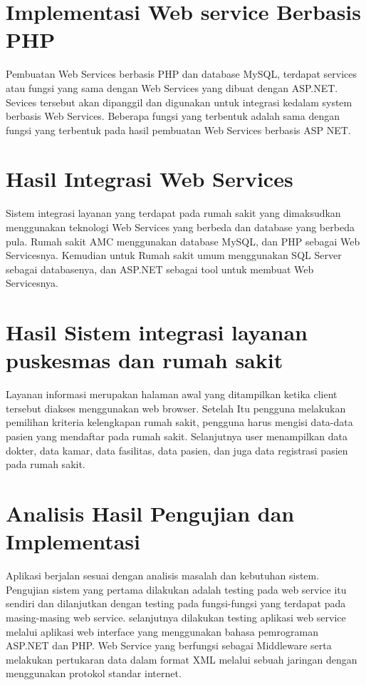 \documentclass[12pt,a4paper]{article}
\begin{document}
\section{Implementasi Web service Berbasis PHP}
Pembuatan Web Services berbasis PHP dan database MySQL, terdapat  services atau fungsi yang sama 
dengan Web Services yang dibuat dengan ASP.NET. Sevices tersebut akan dipanggil dan digunakan untuk 
integrasi kedalam system berbasis Web Services. Beberapa fungsi yang terbentuk adalah sama dengan fungsi 
yang terbentuk pada hasil pembuatan Web Services berbasis ASP NET.


\section{Hasil Integrasi Web Services}
Sistem integrasi  layanan yang terdapat pada rumah sakit yang dimaksudkan menggunakan teknologi Web Services 
yang berbeda dan database yang berbeda pula. Rumah sakit AMC menggunakan database MySQL, dan PHP sebagai Web Servicesnya.
Kemudian untuk Rumah sakit umum menggunakan SQL Server sebagai databasenya, dan ASP.NET sebagai tool untuk membuat Web Servicesnya.


\section{Hasil Sistem integrasi  layanan puskesmas dan rumah sakit}
Layanan informasi merupakan halaman awal yang ditampilkan ketika client tersebut diakses menggunakan web browser. 
Setelah Itu pengguna melakukan pemilihan kriteria kelengkapan rumah sakit, pengguna harus mengisi data-data pasien yang mendaftar pada rumah sakit. Selanjutnya user  menampilkan data dokter, data kamar, data fasilitas, data pasien, dan juga data registrasi pasien pada rumah sakit.


\section{Analisis Hasil Pengujian dan Implementasi}
Aplikasi berjalan sesuai dengan analisis masalah dan kebutuhan sistem.
Pengujian sistem yang pertama dilakukan adalah testing pada web service itu sendiri 
dan dilanjutkan dengan testing pada fungsi-fungsi  yang terdapat pada masing-masing web service. 
selanjutnya dilakukan testing aplikasi web service melalui aplikasi web interface yang menggunakan bahasa pemrograman ASP.NET dan PHP.
Web Service yang berfungsi sebagai Middleware serta melakukan pertukaran data dalam format XML melalui sebuah jaringan dengan menggunakan protokol standar internet.
\end{document}
